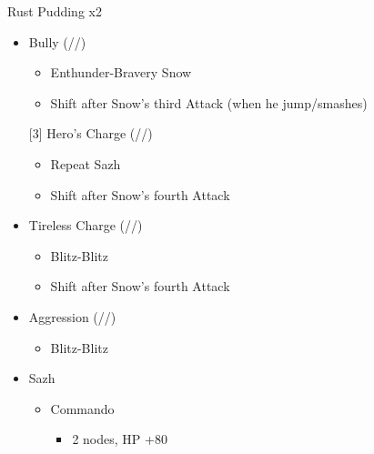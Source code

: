 \renewcommand{\first}{[1] }
\renewcommand{\second}{[2] Devastation (\com/\sab/\com)}
\renewcommand{\third}{[3] Hero's Charge (\syn/\med/\com)}
\renewcommand{\fourth}{[4] Tireless Charge (\com/\med/\com)}
\renewcommand{\fifth}{[5] Bully (\syn/\sab/\com)}
\renewcommand{\sixth}{[6] Aggression (\com/\rav/\com)}
\newpage
\begin{multicols}{2}
  \begin{battle}{Rust Pudding x2}
    \begin{itemize}
      \item \fifth
            \begin{itemize}
              \item Enthunder-Bravery Snow
              \item Shift after Snow's third Attack (when he jump/smashes)
            \end{itemize}
            \third
            \begin{itemize}
              \item Repeat Sazh
              \item Shift after Snow's fourth Attack
            \end{itemize}
      \item \fourth
            \begin{itemize}
              \item Blitz-Blitz
              \item Shift after Snow's fourth Attack
            \end{itemize}
      \item \sixth
            \begin{itemize}
              \item Blitz-Blitz
            \end{itemize}
    \end{itemize}
  \end{battle}
  \begin{menu}
    \begin{itemize}
      \crystarium
      \begin{itemize}
        \item Sazh
              \begin{itemize}
                \item Commando
                      \begin{itemize}
                        \item 2 nodes, HP +80
                      \end{itemize}

\end{itemize}
\end{itemize}
\end{itemize}
\end{menu}
\end{multicols}
